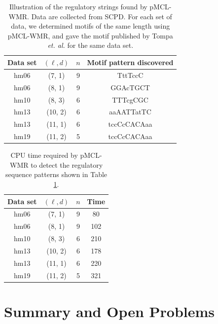 \begin{table}[h]
\begin{center} {
	\begin{tabular}{|c|c|c|c|}
     \hline	
	Data set 	& $(\ell, d)$ & $n$ & Motif pattern discovered  \\
	\hline
	hm06		& (7, 1) &	9	 & TttTccC		   \\
	hm06		& (8, 1) & 9 & GGAcTGCT		    \\
	hm10		& (8, 3) & 6 & TTTcgCGC		  \\	
	hm13		& (10, 2) & 6 & aaAATTatTC		   \\
	hm13		& (11, 1) & 6	 & tccCcCACAaa		    \\
	hm19		& (11, 2) & 5 & tccCcCACAaa		    \\ %
	\hline			
   	\end{tabular}}
\end{center}
\caption[Illustration of the regulatory strings found by pMCL-WMR]{Illustration of the regulatory strings found by pMCL-WMR. Data are collected from SCPD.  For each set of data, we determined motifs of the same length using pMCL-WMR, and gave the motif published by Tompa {\em et. al.} \cite{tompa} for the same data set.  }
\label{bio_table}
\end{table}


\begin{table}[h]
\begin{center} {
	\begin{tabular}{|c|c|c|c|}
     \hline	
	Data set	& $(\ell, d)$ & $n$& Time \\
	\hline
	hm06		& (7, 1) &	9		& 80 \\
	hm06		& (8, 1) & 9		& 102 \\
	hm10		& (8, 3) & 6		& 210\\	
	hm13		& (10, 2) & 6		& 178 \\
	hm13		& (11, 1) & 6		& 220 \\
	hm19		& (11, 2) & 5		& 321\\ %
	\hline			
   	\end{tabular}}
\end{center}
\caption[CPU time required by pMCL-WMR to detect the regulatory sequence patterns shown in Table \ref{bio_table}]{CPU time required by pMCL-WMR to detect the regulatory sequence patterns shown in Table \ref{bio_table}.}
\label{bio_table:runtime}
\end{table}

\section{Summary and Open Problems}

